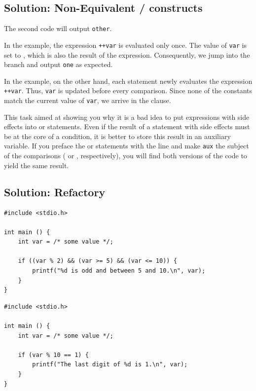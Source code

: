 \subsection*{Solution: Non-Equivalent / constructs}
The second code will output \texttt{other}. 

In the  example, the expression \texttt{++var} is evaluated only once. The value of \texttt{var} is set to , which is also the result of the expression. Consequently, we jump into the branch  and output \texttt{one} as expected.

In the  example, on the other hand, each  statement newly evaluates the expression \texttt{++var}. Thus, \texttt{var} is updated before every comparison. Since none of the constants match the current value of \texttt{var}, we arrive in the  clause.

This task aimed at showing you why it is a bad idea to put expressions with side effects into  or  statements. Even if the result of a statement with side effects must be at the core of a condition, it is better to store this result in an auxiliary variable. If you preface the  or  statements with the line  and make \texttt{aux} the subject of the comparisons ( or , respectively), you will find both versions of the code to yield the same result.


\subsection*{Solution: Refactory}
\begin{codebox}[exo5-6.c]
\begin{verbatim}
#include <stdio.h>

int main () {
    int var = /* some value */;

    if ((var % 2) && (var >= 5) && (var <= 10)) {
        printf("%d is odd and between 5 and 10.\n", var);
    }
}
\end{verbatim}
\end{codebox}

\begin{codebox}
\begin{verbatim}
#include <stdio.h>

int main () {
    int var = /* some value */;

    if (var % 10 == 1) {
        printf("The last digit of %d is 1.\n", var);
    }
}
\end{verbatim}
\end{codebox}